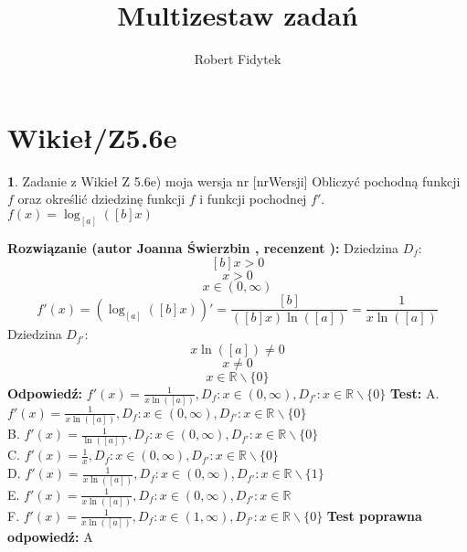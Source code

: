 \documentclass[12pt, a4paper]{article}
\title{Multizestaw zadań}
\author{Robert Fidytek}
\date{}
\theoremstyle{definition} %
\newtheorem{zad}{}
\newcommand{\kategoria}[1]{\section{#1}} %
\newcommand{\zadStart}[1]{\begin{zad}#1\newline} %
\newcommand{\zadStop}{\end{zad}}   %
\newcommand{\rozwStart}[2]{\noindent \textbf{Rozwiązanie (autor #1 , recenzent #2): }\newline} %
\newcommand{\rozwStop}{\newline}                                            %
\newcommand{\odpStart}{\noindent \textbf{Odpowiedź:}\newline}    %
\newcommand{\odpStop}{\newline}                                             %
\newcommand{\testStart}{\noindent \textbf{Test:}\newline} %
\newcommand{\testStop}{\newline} %
\newcommand{\kluczStart}{\noindent \textbf{Test poprawna odpowiedź:}\newline} %
\newcommand{\kluczStop}{\newline} %
\begin{document}
\maketitle


\kategoria{Wikieł/Z5.6e}
\zadStart{Zadanie z Wikieł Z 5.6e) moja wersja nr [nrWersji]}
Obliczyć pochodną funkcji $f$ oraz określić dziedzinę funkcji $f$ i funkcji pochodnej $f'$.\\
$f(x)=\log_{[a]}{([b]x)}$
\zadStop
\rozwStart{Joanna Świerzbin}{}
Dziedzina $D_f: $
$$[b]x>0$$
$$x>0$$
$$x\in (0,\infty) $$
$$ f'(x)=(\log_{[a]}{([b]x)})'=\frac{[b]}{([b]x)\ln([a])}=\frac{1}{x\ln([a])} $$ 
Dziedzina $D_{f'}:$
$$ {x\ln([a])} \neq 0 $$
$$ x \neq 0 $$
$$ x \in \mathbb{R} \backslash \{0\} $$
\rozwStop
\odpStart
$f'(x)=\frac{1}{x\ln([a])}, D_f: x\in (0,\infty), D_{f'}: x \in \mathbb{R} \backslash \{0\}$
\odpStop
\testStart
A. $f'(x)=\frac{1}{x\ln([a])}, D_f: x\in (0,\infty), D_{f'}: x \in \mathbb{R} \backslash \{0\}$\\
B. $f'(x)=\frac{1}{\ln([a])}, D_f: x\in (0,\infty), D_{f'}: x \in \mathbb{R} \backslash \{0\}$\\
C. $f'(x)=\frac{1}{x}, D_f: x\in (0,\infty), D_{f'}: x \in \mathbb{R} \backslash \{0\}$\\
D. $f'(x)=\frac{1}{x\ln([a])}, D_f: x\in (0,\infty), D_{f'}: x \in \mathbb{R} \backslash \{1\}$\\
E. $f'(x)=\frac{1}{x\ln([a])}, D_f: x\in (0,\infty), D_{f'}: x \in \mathbb{R} $\\
F. $f'(x)=\frac{1}{x\ln([a])}, D_f: x\in (1,\infty), D_{f'}: x \in \mathbb{R} \backslash \{0\}$
\testStop
\kluczStart
A
\kluczStop
\end{document}
